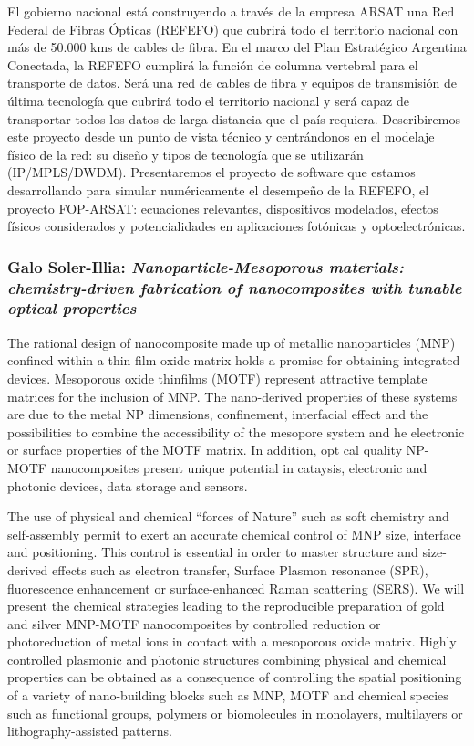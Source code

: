 El gobierno nacional est\'a construyendo a trav\'es de la empresa ARSAT una Red
Federal de Fibras \'Opticas (REFEFO) que cubrir\'a todo el territorio nacional
con m\'as de 50.000 kms de cables de fibra. En el marco del Plan Estrat\'egico
Argentina Conectada, la REFEFO cumplir\'a la funci\'on de columna vertebral para
el transporte de datos. Ser\'a una red de cables de fibra y equipos de
transmisi\'on de \'ultima tecnolog\'ia que cubrir\'a todo el territorio nacional
y ser\'a capaz de transportar todos los datos de larga distancia que el pa\'is
requiera. Describiremos este proyecto desde un punto de vista t\'ecnico y
centr\'andonos en el modelaje f\'isico de la red: su diseño y tipos de
tecnolog\'ia que se utilizar\'an (IP/MPLS/DWDM). Presentaremos el proyecto de
software que estamos desarrollando para simular num\'ericamente el desempeño de
la REFEFO, el proyecto FOP-ARSAT: ecuaciones relevantes, dispositivos modelados,
efectos f\'isicos considerados y potencialidades en aplicaciones fot\'onicas y
optoelectr\'onicas.

\subsubsection*{Galo Soler-Illia: \textit{Nanoparticle-Mesoporous materials:
chemistry-driven fabrication of nanocomposites with tunable optical properties}}

The rational design of nanocomposite made up of metallic nanoparticles
(MNP) confined within a thin film oxide matrix holds a promise for obtaining
integrated devices. Mesoporous oxide thinfilms (MOTF) represent attractive
template matrices for the inclusion of MNP. The nano-derived properties of these systems are due to the metal NP dimensions, confinement, interfacial effect
 and the possibilities to combine the accessibility of the mesopore system and 
he electronic or surface properties of the MOTF matrix. In addition,  opt
cal quality NP-MOTF nanocomposites present unique potential in cataysis, electronic and photonic devices, data storage and sensors.              



The use of physical and chemical ``forces of Nature'' such as soft chemistry and
self-assembly permit to exert an accurate chemical control of MNP size,
interface and positioning. This control is essential in order to master
structure and size-derived effects such as electron transfer, Surface Plasmon
resonance (SPR), fluorescence enhancement or surface-enhanced Raman
scattering (SERS). We will present the chemical strategies leading to the
reproducible preparation of gold and silver MNP-MOTF nanocomposites by
controlled reduction or photoreduction of metal ions in contact with a
mesoporous oxide matrix. Highly controlled plasmonic and photonic structures
combining physical and chemical properties can be obtained as a consequence of
controlling the spatial positioning of a variety of nano-building blocks such as
MNP, MOTF and chemical species such as functional groups, polymers or
biomolecules in monolayers, multilayers or lithography-assisted patterns.

